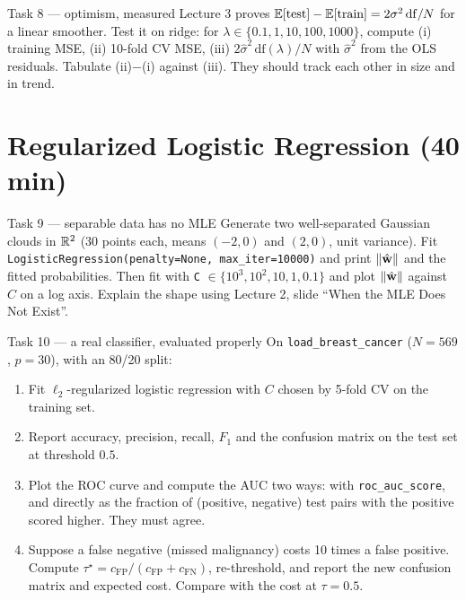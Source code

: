 \documentclass[11pt]{article}
\begin{document}
\begin{task}{Task 8 --- optimism, measured}
Lecture 3 proves $\mathbb{E}[\text{test}]-\mathbb{E}[\text{train}]=2\sigma^2\,\mathrm{df}/N$ for a linear smoother. Test it on ridge:
for $\lambda\in\{0.1,1,10,100,1000\}$, compute (i) training MSE, (ii) 10-fold CV MSE, (iii)
$2\hat\sigma^2\,\mathrm{df}(\lambda)/N$ with $\hat\sigma^2$ from the OLS residuals. Tabulate
(ii)$-$(i) against (iii). They should track each other in size and in trend.
\end{task}

\section{Regularized Logistic Regression (40 min)}

\begin{task}{Task 9 --- separable data has no MLE}
Generate two well-separated Gaussian clouds in $\mathbb{R}^2$ (30 points each, means $(-2,0)$ and $(2,0)$, unit
variance). Fit \texttt{LogisticRegression(penalty=None, max\_iter=10000)} and print $\left\lVert \hat{\mathbf{w}} \right\rVert$ and the
fitted probabilities. Then fit with \texttt{C} $\in\{10^3,10^2,10,1,0.1\}$ and plot $\left\lVert \hat{\mathbf{w}} \right\rVert$ against $C$
on a log axis. Explain the shape using Lecture 2, slide ``When the MLE Does Not Exist''.
\end{task}

\begin{task}{Task 10 --- a real classifier, evaluated properly}
On \texttt{load\_breast\_cancer} ($N=569$, $p=30$), with an 80/20 split:
\begin{enumerate}[nosep]
  \item Fit $\ell_2$-regularized logistic regression with $C$ chosen by 5-fold CV on the training set.
  \item Report accuracy, precision, recall, $F_1$ and the confusion matrix on the test set at threshold $0.5$.
  \item Plot the ROC curve and compute the AUC two ways: with \texttt{roc\_auc\_score}, and directly as the
        fraction of (positive, negative) test pairs with the positive scored higher. They must agree.
  \item Suppose a false negative (missed malignancy) costs 10 times a false positive. Compute
        $\tau^\star=c_{\text{FP}}/(c_{\text{FP}}+c_{\text{FN}})$, re-threshold, and report the new confusion matrix and expected cost.
        Compare with the cost at $\tau=0.5$.
\end{enumerate}
\end{task}
\end{document}
